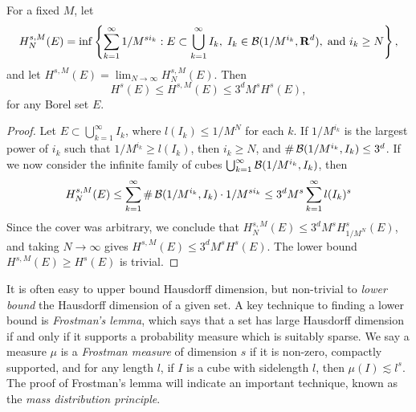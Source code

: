 \begin{lemma}
	For a fixed $M$, let
	\[ H^{s,M}_N(E) = \inf \left\{ \sum_{k = 1}^\infty 1/M^{s i_k} : E \subset \bigcup_{k = 1}^\infty I_k,\; I_k \in \operatorname{\mathcal{B}}(1/M^{i_k},\operatorname{\mathbf{R}}^d), \; \text{and}\ i_k \geq N \right\}, \]
	and let $H^{s,M}(E) = \lim_{N \to \infty} H^{s,M}_N(E)$. Then
	\[ H^s(E) \leq H^{s,M}(E) \leq 3^d M^s H^s(E), \]
	for any Borel set $E$.
\end{lemma}
\begin{proof}
	Let $E \subset \bigcup_{k = 1}^\infty I_k$, where $l(I_k) \leq 1/M^N$ for each $k$. If $1/M^{i_k}$ is the largest power of $i_k$ such that $1/M^{i_k} \geq l(I_k)$, then $i_k \geq N$, and $\# \operatorname{\mathcal{B}}(1/M^{i_k},I_k) \leq 3^d$. If we now consider the infinite family of cubes $\bigcup_{k = 1}^\infty \operatorname{\mathcal{B}}(1/M^{i_k}, I_k)$, then
	\[ H^{s,M}_N(E) \leq \sum_{k = 1}^\infty \# \operatorname{\mathcal{B}}(1/M^{i_k},I_k) \cdot 1/M^{s i_k} \leq 3^d M^s \sum_{k = 1}^\infty l(I_k)^s \]
	Since the cover was arbitrary, we conclude that $H^{s,M}_N(E) \leq 3^d M^s H^s_{1/M^N}(E)$, and taking $N \to \infty$ gives $H^{s,M}(E) \leq 3^d M^s H^s(E)$. The lower bound $H^{s,M}(E) \geq H^s(E)$ is trivial.
\end{proof}

It is often easy to upper bound Hausdorff dimension, but non-trivial to \emph{lower bound} the Hausdorff dimension of a given set. A key technique to finding a lower bound is \emph{Frostman's lemma}, which says that a set has large Hausdorff dimension if and only if it supports a probability measure which is suitably sparse. We say a measure $\mu$ is a \emph{Frostman measure} of dimension $s$ if it is non-zero, compactly supported, and for any length $l$, if $I$ is a cube with sidelength $l$, then $\mu(I) \lesssim l^s$. The proof of Frostman's lemma will indicate an important technique, known as the \emph{mass distribution principle}.

